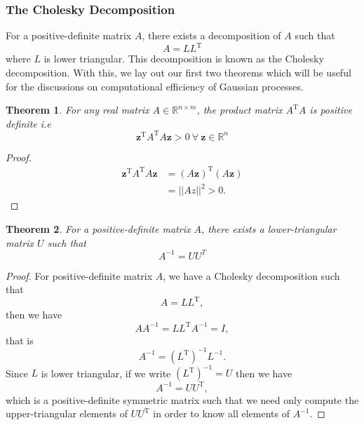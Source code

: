 \documentclass[10pt,a4paper]{article}
\numberwithin{equation}{section}
\theoremstyle{plain}
\newtheorem{thm}{Theorem}
\theoremstyle{definition}
\theoremstyle{own}
\begin{document}
\subsubsection{The Cholesky Decomposition}
For a positive-definite matrix $A$, there exists a decomposition of $A$ such that
\begin{equation}
A = LL^{\text{T}}
\end{equation}
where $L$ is lower triangular. This decomposition is known as the Cholesky decomposition. With this, we lay out our first two theorems which will be useful for the discussions on computational efficiency of Gaussian processes.

\begin{thm} \label{posdef}
For any real matrix $A \in \mathbb{R}^{n \times m}$, the product matrix $A^{\text{T}}A$ is positive definite i.e
\begin{equation}
\mathbf{z}^{\text{T}} A^{\text{T}}A \mathbf{z} > 0 ~ \forall ~ \mathbf{z} \in \mathbb{R}^{n}
\end{equation}
\end{thm}
\begin{proof}
\begin{align} \nonumber
\mathbf{z}^{\text{T}} A^{\text{T}}A \mathbf{z} & = (A \mathbf{z})^{\text{T}} (A \mathbf{z}) \\
& = || Az ||^2 > 0.
\end{align}
\end{proof}
\begin{thm} \label{posdef2}
For a positive-definite matrix $A$, there exists a lower-triangular matrix $U$ such that
\begin{equation}
A^{-1} = U U^{T}
\end{equation}
\end{thm}
\begin{proof}
For positive-definite matrix $A$, we have a Cholesky decomposition such that
\begin{equation}
A = L L^{\text{T}},
\end{equation}
then we have
\begin{equation}
A A^{-1} = L L^{\text{T}} A^{-1} = I,
\end{equation}
that is
\begin{equation}
A^{-1} = ( L^{\text{T}} )^{-1} L^{-1}.
\end{equation}
Since $L$ is lower triangular, if we write $( L^{\text{T}} )^{-1} = U$ then we have
\begin{equation}
A^{-1} = U U^{\text{T}},
\end{equation}
which is a positive-definite symmetric matrix such that we need only compute the upper-triangular elements of $U U^{\text{T}}$ in order to know all elements of $A^{-1}$.
\end{proof}
\end{document}
